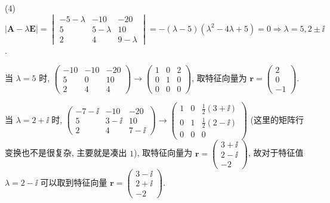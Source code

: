 \begin{solve}
  (4) $\displaystyle|\bm{A}-\lambda\bm{E}|=\begin{vmatrix}-5-\lambda&-10&-20\\5&5-\lambda&10\\2&4&9-\lambda\end{vmatrix}=-(\lambda-5)(\lambda^2-4\lambda+5)=0\Rightarrow\lambda=5,2\pm\ii$.

  当 $\lambda=5$ 时, 
  $\begin{pmatrix}-10&-10&-20\\5&0&10\\2&4&4\end{pmatrix}\to\begin{pmatrix}1&0&2\\0&1&0\\0&0&0\end{pmatrix}$, 
  取特征向量为 $\bm{r}=\begin{pmatrix}2\\0\\-1\end{pmatrix}$.

  当 $\lambda=2+\ii$ 时, 
  $\begin{pmatrix}-7-\ii&-10&-20\\5&3-\ii&10\\2&4&7-\ii\end{pmatrix}\to\begin{pmatrix}1&0&\frac{1}{2}(3+\ii)\\0&1&\frac{1}{2}(2-\ii)\\0&0&0\end{pmatrix}$
  (这里的矩阵行变换也不是很复杂, 主要就是凑出 $1$), 
  取特征向量为 $\bm{r}=\begin{pmatrix}3+\ii\\2-\ii\\-2\end{pmatrix}$,
  故对于特征值 $\lambda=2-\ii$ 可以取到特征向量 $\bm{r}=\begin{pmatrix}3-\ii\\2+\ii\\-2\end{pmatrix}$.


\end{solve}
